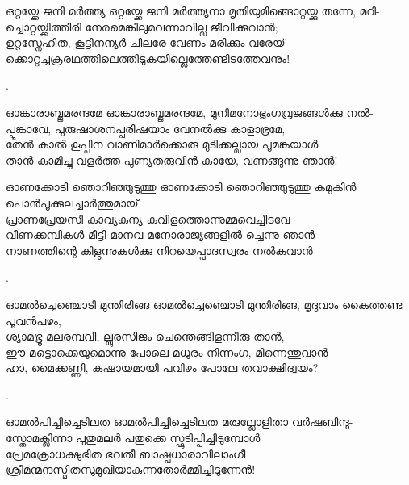 \begin{enumerate}


\begin{slokam}{\VSv}{\PG}{ഒറ്റയ്ക്കേ ജനി മർത്ത്യ}
ഒറ്റയ്ക്കേ ജനി മർത്ത്യനാ മൃതിയുമിങ്ങൊറ്റയ്ക്കു തന്നേ, മറി-\\
ച്ചൊറ്റയ്ക്കിത്തിരി നേരമെങ്കിലുമവന്നാവില്ല ജീവിക്കുവാൻ;\\
ഉറ്റസ്നേഹിത, കൂട്ടിനന്യർ ചിലരേ വേണം മരിക്കും വരേയ്-\\
ക്കൊറ്റച്ചക്രരഥത്തിലെത്തിടുകയില്ലെത്തേണ്ടിടത്തേവനും! 
\end{slokam}


.


\begin{slokam}{\VSv}{\VNM}{ഓങ്കാരാബ്ജമരന്ദമേ}
ഓങ്കാരാബ്ജമരന്ദമേ, മുനിമനോഭൃംഗവ്രജങ്ങള്‍ക്കു നൽ-\\
പ്പൂങ്കാവേ, പുരുഷാശനപ്പരിഷയാം വേനൽക്കു കാളാഭ്രമേ,\\
തേൻ കാൽ കൂപ്പിന വാണിമാർക്കൊരു മുടിക്കല്ലായ പൂമങ്കയാള്‍\\
താൻ കാമിച്ചു വളർത്ത പുണ്യതരുവിൻ കായേ, വണങ്ങുന്നു ഞാൻ!
\end{slokam}


\begin{slokam}{\VSv}{\VRV}{ഓണക്കോടി ഞൊറിഞ്ഞുടുത്തു}
ഓണക്കോടി ഞൊറിഞ്ഞുടുത്തു കമുകിൻ പൊൻപൂക്കുലച്ചാർത്തുമായ്‌\\
പ്രാണപ്രേയസി കാവ്യകന്യ കവിളത്തൊന്നുമ്മവെച്ചീടവേ\\
വീണക്കമ്പികള്‍ മീട്ടി മാനവ മനോരാജ്യങ്ങളിൽ ച്ചെന്നു ഞാൻ\\
നാണത്തിന്റെ കിളുന്നുകള്‍ക്കു നിറയെപ്പാദസ്വരം നൽകുവാൻ
\end{slokam}



.

\begin{slokam}{\VSv}{\VNM}{ഓമൽച്ചെഞ്ചൊടി മുന്തിരിങ്ങ}
ഓമൽച്ചെഞ്ചൊടി മുന്തിരിങ്ങ, മൃദുവാം കൈത്തണ്ട പൂവൻപഴം,\\
ശ്യാമഭ്രൂ മലരമ്പവി, ല്ലുരസിജം ചെന്തെങ്ങിളന്നീരു താൻ, \\
ഈ മട്ടൊക്കെയുമൊന്നു പോലെ മധുരം നിന്നംഗ, മിന്നെന്തുവാൻ \\
ഹാ, മൈക്കണ്ണി, കഷായമായി പവിഴം പോലേ തവാക്ഷിദ്വയം?
\end{slokam}


.


\begin{slokam}{\VMk}{\KV}{ഓമൽപിച്ചിച്ചെടിലത}
ഓമൽപിച്ചിച്ചെടിലത മരുല്ലോളിതാ വർഷബിന്ദു-\\
സ്തോമക്ലിന്നാ പുതുമലർ പതുക്കെ സ്ഫുടിപ്പിച്ചിടുമ്പോൾ\\
പ്രേമക്രോധക്ഷുഭിത ഭവതീ ബാഷ്പധാരാവിലാംഗീ\\
ശ്രീമന്മന്ദസ്മിതസുമുഖിയാകുന്നതോർമ്മിച്ചിടുന്നേൻ!
\end{slokam}


\end{enumerate}
